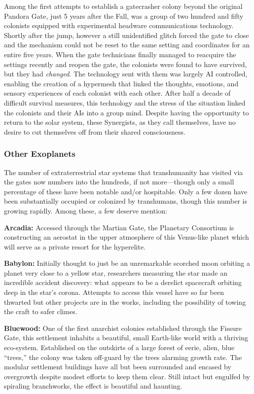Among the first attempts to establish a gatecrasher 
colony beyond the original Pandora Gate, just 5 years 
after the Fall, was a group of two hundred and fifty 
colonists equipped with experimental headware communications
technology. Shortly after the jump, however
a still unidentified glitch forced the gate to close
and the mechanism could not be reset to the same setting
and coordinates for an entire five years. When the
gate technicians finally managed to reacquire the settings
recently and reopen the gate, the colonists were
found to have survived, but they had \textit{changed}. The 
technology sent with them was largely AI controlled, 
enabling the creation of a hypermesh that linked the 
thoughts, emotions, and sensory experiences of each 
colonist with each other. After half a decade of difficult
survival measures, this technology and the stress
of the situation linked the colonists and their AIs into 
a group mind. Despite having the opportunity to 
return to the solar system, these Synergists, as they 
call themselves, have no desire to cut themselves off 
from their shared consciousness.

\subsubsection{Other Exoplanets}

The number of extraterrestrial star systems that transhumanity
has visited via the gates now numbers into
the hundreds, if not more—though only a small percentage
of these have been notable and/or hospitable.
Only a few dozen have been substantially occupied 
or colonized by transhumans, though this number is 
growing rapidly. Among these, a few deserve mention:

\textbf{Arcadia:} Accessed through the Martian Gate, the 
Planetary Consortium is constructing an aerostat in 
the upper atmosphere of this Venus-like planet which 
will serve as a private resort for the hyperelite.

\textbf{Babylon:} Initially thought to just be an unremarkable
scorched moon orbiting a planet very close to a
yellow star, researchers measuring the star made an 
incredible accident discovery: what appears to be a 
derelict spacecraft orbiting deep in the star's corona. 
Attempts to access this vessel have so far been thwarted
but other projects are in the works, including the
possibility of towing the craft to safer climes.

\textbf{Bluewood:} One of the first anarchist colonies established
through the Fissure Gate, this settlement
inhabits a beautiful, small Earth-like world with a 
thriving eco-system. Established on the outskirts of 
a large forest of eerie, alien, blue ``trees,'' the colony 
was taken off-guard by the trees alarming growth 
rate. The modular settlement buildings have all but 
been surrounded and encased by overgrowth despite 
modest efforts to keep them clear. Still intact but engulfed
by spiraling branchworks, the effect is beautiful
and haunting.

